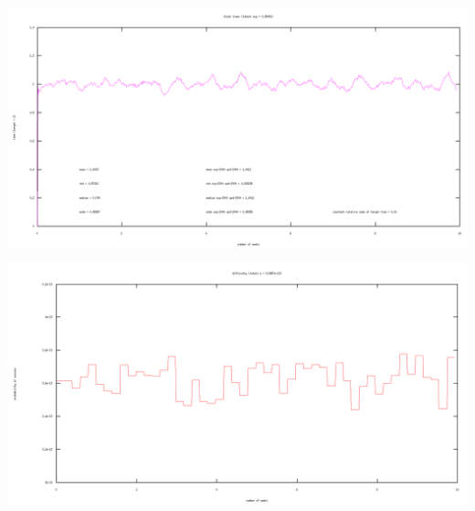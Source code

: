 \documentclass[10pt,a4paper]{article}
\begin{document}
\includegraphics[width=14cm]{SimulationGraphs/simulation_avg-2000_upd-2000_btc.png}

\includegraphics[width=14cm]{SimulationGraphs/simulation_avg-2000_upd-2000_btc_diff.png}
\end{document}
